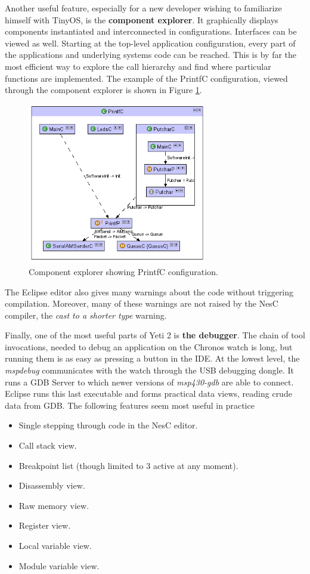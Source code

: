 Another useful feature, especially for a new developer wishing to familiarize himself with TinyOS, is the {\bf component explorer}. It graphically displays components instantiated and interconnected in configurations. Interfaces can be viewed as well.  Starting at the top-level application configuration, every part of the applications and underlying systems code can be reached. This is by far the most efficient way to explore the call hierarchy and find where particular functions are implemented. The example of the PrintfC configuration, viewed through the component explorer is shown in Figure \ref{fig:eclipse_compexp}.

\begin{figure}[h]
  \centering
  \includegraphics[width=0.7\textwidth]{img/eclipse_compexp.png}
  \caption{Component explorer showing PrintfC configuration.}
  \label{fig:eclipse_compexp}
\end{figure}

The Eclipse editor also gives many warnings about the code without triggering compilation. Moreover, many of these warnings are not raised by the NesC compiler, the \emph{cast to a shorter type} warning.

Finally, one of the most useful parts of Yeti 2 is {\bf the debugger}.  The chain of tool invocations, needed to debug an application on the Chronos watch is long, but running them is as easy as pressing a button in the IDE. At the lowest level, the \emph{mspdebug} communicates with the watch through the USB debugging dongle. It runs a GDB Server to which newer versions of \emph{msp430-gdb} are able to connect. Eclipse runs this last executable and forms practical data views, reading crude data from GDB. The following features seem most useful in practice
\begin{itemize}
  \item Single stepping through code in the NesC editor.
  \item Call stack view.
  \item Breakpoint list (though limited to 3 active at any moment).
  \item Disassembly view.
  \item Raw memory view.
  \item Register view.
  \item Local variable view.
  \item Module variable view.
\end{itemize}

